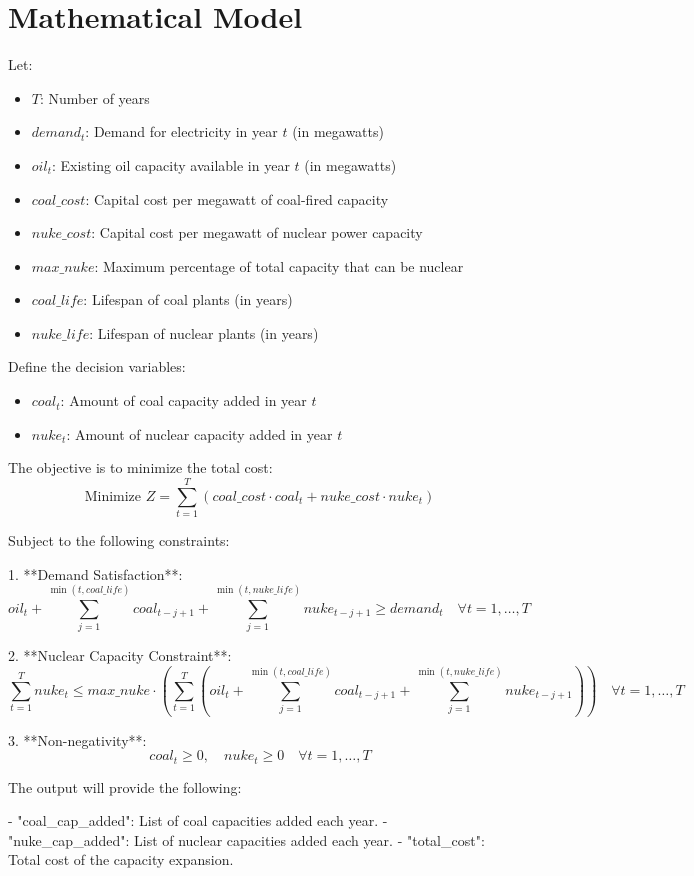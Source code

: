 \documentclass{article}
\begin{document}
\section*{Mathematical Model}

Let:
\begin{itemize}
    \item $T$: Number of years
    \item $demand_t$: Demand for electricity in year $t$ (in megawatts)
    \item $oil_t$: Existing oil capacity available in year $t$ (in megawatts)
    \item $coal\_cost$: Capital cost per megawatt of coal-fired capacity
    \item $nuke\_cost$: Capital cost per megawatt of nuclear power capacity
    \item $max\_nuke$: Maximum percentage of total capacity that can be nuclear
    \item $coal\_life$: Lifespan of coal plants (in years)
    \item $nuke\_life$: Lifespan of nuclear plants (in years)
\end{itemize}

Define the decision variables:
\begin{itemize}
    \item $coal_t$: Amount of coal capacity added in year $t$
    \item $nuke_t$: Amount of nuclear capacity added in year $t$
\end{itemize}

The objective is to minimize the total cost:
\[
\text{Minimize } Z = \sum_{t=1}^T (coal\_cost \cdot coal_t + nuke\_cost \cdot nuke_t)
\]

Subject to the following constraints:

1. **Demand Satisfaction**:
   \[
   oil_t + \sum_{j=1}^{\min(t, coal\_life)} coal_{t-j+1} + \sum_{j=1}^{\min(t, nuke\_life)} nuke_{t-j+1} \geq demand_t \quad \forall t = 1, \ldots, T
   \]

2. **Nuclear Capacity Constraint**:
   \[
   \sum_{t=1}^{T} nuke_t \leq max\_nuke \cdot \left( \sum_{t=1}^{T} \left( oil_t + \sum_{j=1}^{\min(t, coal\_life)} coal_{t-j+1} + \sum_{j=1}^{\min(t, nuke\_life)} nuke_{t-j+1} \right) \right) \quad \forall t = 1, \ldots, T
   \]

3. **Non-negativity**:
   \[
   coal_t \geq 0, \quad nuke_t \geq 0 \quad \forall t = 1, \ldots, T
   \]

The output will provide the following:

- "coal\_cap\_added": List of coal capacities added each year.
- "nuke\_cap\_added": List of nuclear capacities added each year.
- "total\_cost": Total cost of the capacity expansion.
\end{document}
